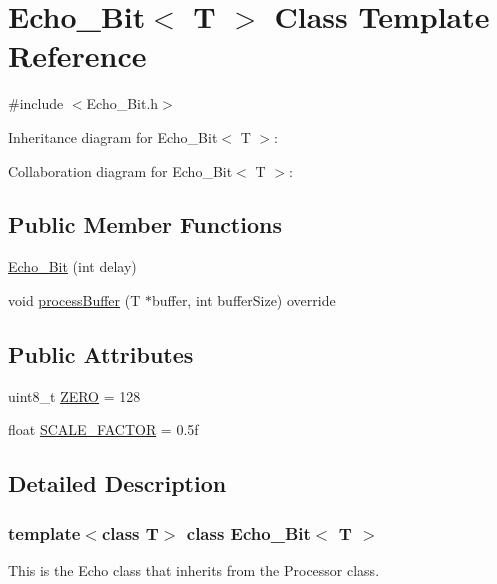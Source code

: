 \hypertarget{classEcho__8Bit}{}\section{Echo\+\_\+Bit$<$ T $>$ Class Template Reference}
\label{classEcho__8Bit}


{\ttfamily \#include $<$Echo\+\_\+Bit.\+h$>$}



Inheritance diagram for Echo\+\_\+Bit$<$ T $>$\+:


Collaboration diagram for Echo\+\_\+Bit$<$ T $>$\+:
\subsection*{Public Member Functions}
\begin{DoxyCompactItemize}
\item 
\hyperlink{classEcho__8Bit_a19ea3f23dc06bdf6ef74f50e972accf2}{Echo\+\_\+Bit} (int delay)
\item 
void \hyperlink{classEcho__8Bit_a01c7182a58f21a4a0bc0cd040720b109}{process\+Buffer} (T $\ast$buffer, int buffer\+Size) override
\end{DoxyCompactItemize}
\subsection*{Public Attributes}
\begin{DoxyCompactItemize}
\item 
uint8\+\_\+t \hyperlink{classEcho__8Bit_a2f1c64b678e48cc37f55739fd85e65b3}{Z\+E\+RO} = 128
\item 
float \hyperlink{classEcho__8Bit_a26bd2ba0910d1e4bb84357b6f83c776b}{S\+C\+A\+L\+E\+\_\+\+F\+A\+C\+T\+OR} = 0.\+5f
\end{DoxyCompactItemize}


\subsection{Detailed Description}
\subsubsection*{template$<$class T$>$\newline
class Echo\+\_\+Bit$<$ T $>$}

This is the Echo class that inherits from the Processor class. 


